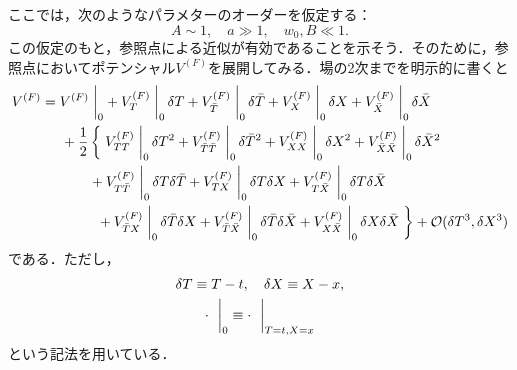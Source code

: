 \documentclass[a4paper,uplatex,dvipdfmx]{jsarticle}
\theoremstyle{definition}
\begin{document}
ここでは，次のようなパラメターのオーダーを仮定する：
\begin{equation}
   A\sim 1
   ,\quad
   a\gg 1
   ,\quad 
   w_0, B\ll 1
   .
   \label{assumption_parameter_Polonyi-KKLT}
\end{equation}
この仮定のもと，参照点による近似が有効であることを示そう．そのために，参照点においてポテンシャル$V^{(F)}$を展開してみる．場の2次までを明示的に書くと
\begin{align}
   V^{(F)}
   &=
   V^{(F)}
   \left.\vphantom{\frac{1}{2}}\right|_{0}
   +
   V^{(F)}_{T}
   \left.\vphantom{\frac{1}{2}}\right|_{0} 
   \delta T
   +
   V^{(F)}_{\bar{T}}
   \left.\vphantom{\frac{1}{2}}\right|_{0} 
   \delta \bar{T}
   +
   V^{(F)}_{X}
   \left.\vphantom{\frac{1}{2}}\right|_{0} 
   \delta X
   +
   V^{(F)}_{\bar{X}}
   \left.\vphantom{\frac{1}{2}}\right|_{0} 
   \delta \bar{X}
   \nonumber
   \\
   &\hspace*{0.5cm}
   +
   \frac{1}{2}
   \left\{\vphantom{\frac{1}{2}}\right.
   V^{(F)}_{TT}
   \left.\vphantom{\frac{1}{2}}\right|_{0} 
   \delta T^2
   +
   V^{(F)}_{\bar{T}\bar{T}}
   \left.\vphantom{\frac{1}{2}}\right|_{0} 
   \delta \bar{T}^2
   +
   V^{(F)}_{XX}
   \left.\vphantom{\frac{1}{2}}\right|_{0} 
   \delta X^2
   +
   V^{(F)}_{\bar{X}\bar{X}}
   \left.\vphantom{\frac{1}{2}}\right|_{0} 
   \delta \bar{X}^2
   \nonumber
   \\
   &\hspace*{1.2cm}
   +
   V^{(F)}_{T\bar{T}}
   \left.\vphantom{\frac{1}{2}}\right|_{0} 
   \delta T\delta \bar{T}
   +
   V^{(F)}_{TX}
   \left.\vphantom{\frac{1}{2}}\right|_{0} 
   \delta T\delta X
   +
   V^{(F)}_{T\bar{X}}
   \left.\vphantom{\frac{1}{2}}\right|_{0} 
   \delta T\delta \bar{X}
   \nonumber
   \\
   &\hspace*{1.4cm}
   +
   V^{(F)}_{\bar{T}X}
   \left.\vphantom{\frac{1}{2}}\right|_{0} 
   \delta \bar{T}\delta X
   +
   V^{(F)}_{\bar{T}\bar{X}}
   \left.\vphantom{\frac{1}{2}}\right|_{0} 
   \delta \bar{T}\delta \bar{X}
   +
   V^{(F)}_{X\bar{X}}
   \left.\vphantom{\frac{1}{2}}\right|_{0} 
   \delta X\delta \bar{X}
   \left.\vphantom{\frac{1}{2}}\right\}
   +
   \mathcal{O}(\delta T^3,\delta X^3)
   \label{expansion_F-term}
\end{align}
である．ただし，
\begin{gather}
   \delta T
   \equiv
   T-t
   ,\quad
   \delta X
   \equiv
   X-x
   ,
   \nonumber
   \\
   \cdot\ 
   \left.\vphantom{\frac{1}{2}}\right|_{0}
   \equiv
   \cdot\ 
   \left.\vphantom{\frac{1}{2}}\right|_{T=t,X=x}
   \nonumber
\end{gather}
という記法を用いている．
\end{document}
